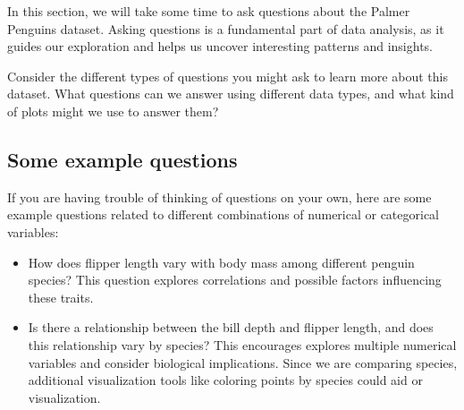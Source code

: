 \documentclass[
  letterpaper,
  DIV=11,
  numbers=noendperiod]{scrreprt}
\begin{document}
In this section, we will take some time to ask questions about the
Palmer Penguins dataset. Asking questions is a fundamental part of data
analysis, as it guides our exploration and helps us uncover interesting
patterns and insights.

Consider the different types of questions you might ask to learn more
about this dataset. What questions can we answer using different data
types, and what kind of plots might we use to answer them?

\subsection{Some example questions}\label{some-example-questions}

If you are having trouble of thinking of questions on your own, here are
some example questions related to different combinations of numerical or
categorical variables:

\begin{tcolorbox}[enhanced jigsaw, bottomtitle=1mm, bottomrule=.15mm, toprule=.15mm, opacityback=0, leftrule=.75mm, breakable, colback=white, toptitle=1mm, left=2mm, coltitle=black, titlerule=0mm, opacitybacktitle=0.6, title=\textcolor{quarto-callout-note-color}{\faInfo}\hspace{0.5em}{Questions leading to numerical by numerical plots}, rightrule=.15mm, arc=.35mm, colframe=quarto-callout-note-color-frame, colbacktitle=quarto-callout-note-color!10!white]

\begin{itemize}
\item
  How does flipper length vary with body mass among different penguin
  species? This question explores correlations and possible factors
  influencing these traits.
\item
  Is there a relationship between the bill depth and flipper length, and
  does this relationship vary by species? This encourages explores
  multiple numerical variables and consider biological implications.
  Since we are comparing species, additional visualization tools like
  coloring points by species could aid or visualization.
\end{itemize}

\end{tcolorbox}
\end{document}
